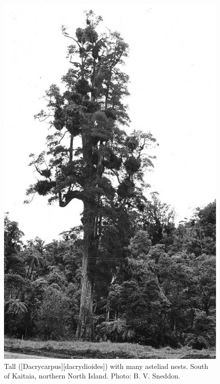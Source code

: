\begin{figure}[!htb]
	\centering
	\begin{minipage}[t]{0.437\textwidth}
		\centering
		\includegraphics[width=\textwidth]{graphics/figure39kahikatea.jpg}
    	\caption[Tall kahikatea with many asteliad nests]{Tall  ([Dacrycarpus][dacrydioides]) with many asteliad nests.
    	South of Kaitaia, northern North Island.
    	Photo: B. V. Sneddon.}%
    	\label{fig:39kahikatea}
	\end{minipage}\hfill%
	\begin{minipage}[t]{0.543\textwidth}

\end{minipage}
\end{figure}
